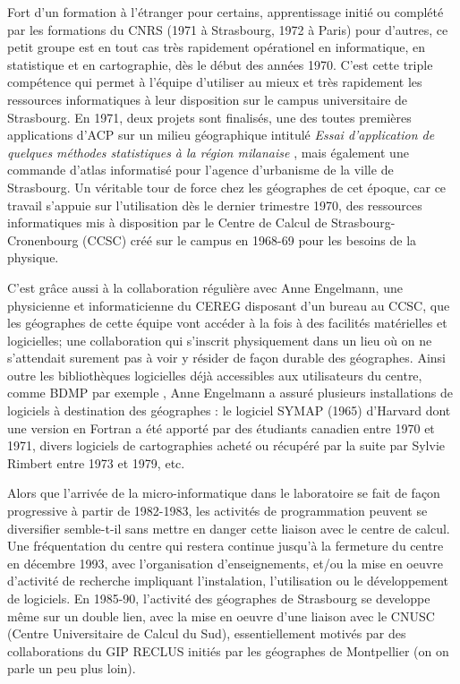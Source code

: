 Fort d'un formation à l'étranger pour certains, apprentissage initié ou complété par les formations du CNRS (1971 à Strasbourg, 1972 à Paris) pour d'autres, ce petit groupe est en tout cas très rapidement opérationel en informatique, en statistique et en cartographie, dès le début des années 1970. C'est cette triple compétence qui permet à l'équipe d'utiliser au mieux et très rapidement les ressources informatiques à leur disposition sur le campus universitaire de Strasbourg. En 1971, deux projets sont finalisés, une des toutes premières applications d’ACP sur un milieu géographique intitulé \textit{Essai d’application de quelques méthodes statistiques à la région milanaise} \autocite{Dalmasso1971}, mais également une commande d'atlas informatisé pour l'agence d'urbanisme de la ville de Strasbourg. Un véritable tour de force chez les géographes de cet époque, car ce travail s'appuie sur l'utilisation dès le dernier trimestre 1970, des ressources informatiques mis à disposition par le Centre de Calcul de Strasbourg-Cronenbourg (CCSC) créé sur le campus en 1968-69 pour les besoins de la physique.

C'est grâce aussi à la collaboration régulière avec Anne Engelmann, une physicienne et informaticienne du CEREG disposant d'un bureau au CCSC, que les géographes de cette équipe vont accéder à la fois à des facilités matérielles  et logicielles; une collaboration qui s'inscrit physiquement dans un lieu où on ne s'attendait surement pas à voir y résider de façon durable des géographes. Ainsi outre les bibliothèques logicielles déjà accessibles aux utilisateurs du centre, comme BDMP par exemple , Anne Engelmann a assuré plusieurs installations de logiciels à destination des géographes : le logiciel SYMAP (1965) d'Harvard dont une version en Fortran a été apporté par des étudiants canadien entre 1970 et 1971, divers logiciels de cartographies acheté ou récupéré par la suite par Sylvie Rimbert entre 1973 et 1979, etc.

Alors que l'arrivée de la micro-informatique dans le laboratoire se fait de façon progressive à partir de 1982-1983, les activités de programmation peuvent se diversifier semble-t-il sans mettre en danger cette liaison avec le centre de calcul. Une fréquentation du centre qui restera continue jusqu'à la fermeture du centre en décembre 1993, avec l'organisation d'enseignements, et/ou la mise en oeuvre d'activité de recherche impliquant l'instalation, l'utilisation ou le développement de logiciels. En 1985-90, l'activité des géographes de Strasbourg se developpe même sur un double lien, avec la mise en oeuvre d'une liaison avec le CNUSC (Centre Universitaire de Calcul du Sud), essentiellement motivés par des collaborations du GIP RECLUS initiés par les géographes de Montpellier (on on parle un peu plus loin).

